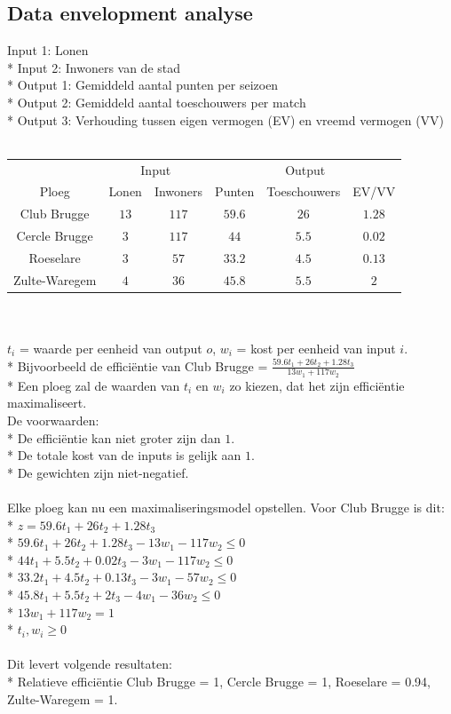 \documentclass[10pt]{article}
\begin{document}
\subsection{Data envelopment analyse}
Input 1: Lonen\\*
Input 2: Inwoners van de stad\\*
Output 1: Gemiddeld aantal punten per seizoen\\*
Output 2: Gemiddeld aantal toeschouwers per match\\*
Output 3: Verhouding tussen eigen vermogen (EV) en vreemd vermogen (VV)\\\\
\begin{tabular}{| c | c c | c c c |}
\hline
 & \multicolumn{2}{|c|}{Input} & \multicolumn{3}{|c|}{Output} \\
Ploeg & Lonen & Inwoners & Punten & Toeschouwers & EV/VV \\ \hline
Club Brugge & $13$ & $117$ & $59.6$ & $26$ & $1.28$ \\ \hline
Cercle Brugge & $3$ & $117$ & $44$ & $5.5$ & $0.02$ \\ \hline
Roeselare & $3$ & $57$ & $33.2$ & $4.5$ & $0.13$ \\ \hline
Zulte-Waregem & $4$ & $36$ & $45.8$ & $5.5$ & $2$ \\ \hline
\end{tabular}\\\\
$t_i$ = waarde per eenheid van output $o$, $w_i$ = kost per eenheid van input $i$.\\*
Bijvoorbeeld de effici\"entie van Club Brugge = $\frac{59.6t_1 + 26t_2 + 1.28t_3}{13w_1 + 117w_2}$\\*
Een ploeg zal de waarden van $t_i$ en $w_i$ zo kiezen, dat het zijn effici\"entie maximaliseert.\\
De voorwaarden:\\*
De effici\"entie kan niet groter zijn dan $1$.\\*
De totale kost van de inputs is gelijk aan $1$.\\*
De gewichten zijn niet-negatief.\\\\
Elke ploeg kan nu een maximaliseringsmodel opstellen. Voor Club Brugge is dit:\\*
$z = 59.6t_1 + 26t_2 + 1.28t_3$\\*
$59.6t_1 + 26t_2 + 1.28t_3 - 13w_1 - 117w_2 \le 0$\\*
$44t_1 + 5.5t_2 + 0.02t_3 - 3w_1 - 117w_2 \le 0$\\*
$33.2t_1 + 4.5t_2 + 0.13t_3 - 3w_1 - 57w_2 \le 0$\\*
$45.8t_1 + 5.5t_2 + 2t_3 - 4w_1 - 36w_2 \le 0$\\*
$13w_1 + 117w_2 = 1$\\*
$t_i, w_i \ge 0$\\\\
Dit levert volgende resultaten:\\*
Relatieve effici\"entie Club Brugge = 1, Cercle Brugge = 1, Roeselare = 0.94, Zulte-Waregem = 1.
\end{document}
